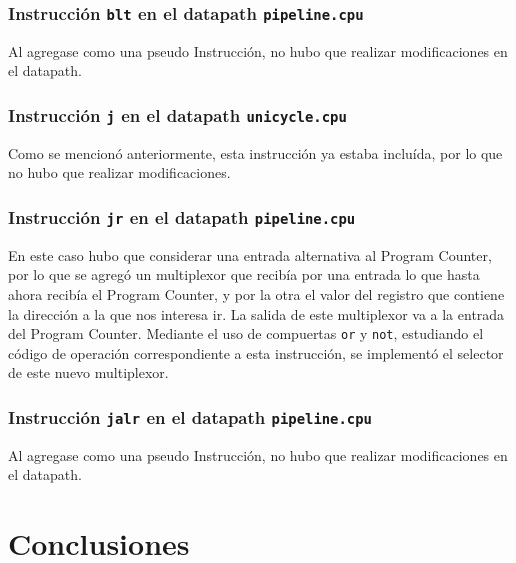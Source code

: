 \documentclass[a4paper,10pt]{article}
\begin{document}
\subsubsection{Instrucción \texttt{blt} en el datapath \texttt{pipeline.cpu}}
Al agregase como una pseudo Instrucci\'on, no hubo que realizar modificaciones en el datapath. 

\subsubsection{Instrucción \texttt{j} en el datapath \texttt{unicycle.cpu}}
Como se mencionó anteriormente, esta instrucción ya estaba incluída, por lo que no hubo que realizar modificaciones. 

\subsubsection{Instrucción \texttt{jr} en el datapath \texttt{pipeline.cpu}}
En este caso hubo que considerar una entrada alternativa al Program Counter, por lo que se agregó un multiplexor que recibía por una entrada lo que hasta ahora recibía el Program Counter, y por la otra el valor del registro que contiene la direcci\'on a la que nos interesa ir. La salida de este multiplexor va a la entrada del Program Counter. Mediante el uso de compuertas \texttt{or} y \texttt{not}, estudiando el c\'odigo de operaci\'on correspondiente a esta instrucci\'on, se implement\'o el selector de este nuevo multiplexor. 

\subsubsection{Instrucción \texttt{jalr} en el datapath \texttt{pipeline.cpu}}
Al agregase como una pseudo Instrucci\'on, no hubo que realizar modificaciones en el datapath. 

\newpage

\section{Conclusiones}


\end{document}
